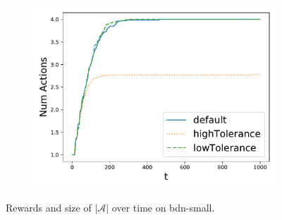 \documentclass{article}
\begin{document}
\begin{figure}
\begin{subfigure}{0.333\textwidth}
				\includegraphics[width=\textwidth]{smallDNActions}
				\caption{}
			\end{subfigure}		
			\caption{Rewards and size of $|\mathcal{A}|$ over time on bdn-small.}
			\label{fig:results-small}
		\end{figure}
		
\end{document}
